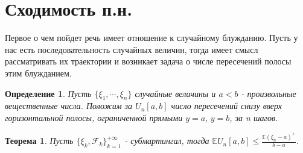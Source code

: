 \documentclass[12pt,a4paper]{article} %
\newtheorem{theorem}{Теорема}
\newtheorem{definition}{Определение}
\newcommand{\E}{\mathbb{E}}
\newcommand{\F}{\mathcal{F}}
\begin{document}
	\section{Сходимость п.н.}
	Первое о чем пойдет речь имеет отношение к случайному блужданию. Пусть у нас есть последовательность случайных величин, тогда имеет смысл рассматривать их траектории и возникает задача о числе пересечений полосы этим блужданием.
	\begin{definition}
		Пусть $\{\xi_1,\cdots,\xi_n\}$ случайные величины и $a<b$ - произвольные вещественные числа. Положим за $U_n[a,b]$ число пересечений снизу вверх горизонтальной полосы, ограниченной прямыми $y=a,\,y=b$, за n шагов.
	\end{definition}
	\begin{theorem}
		Пусть $\{\xi_k,\F_k\}_{k=1}^{+\infty}$ - субмартингал, тогда $\displaystyle\E U_n[a,b]\leq\frac{\E(\xi_n-a)^{+}}{b-a}$.
	\end{theorem}
\end{document}
